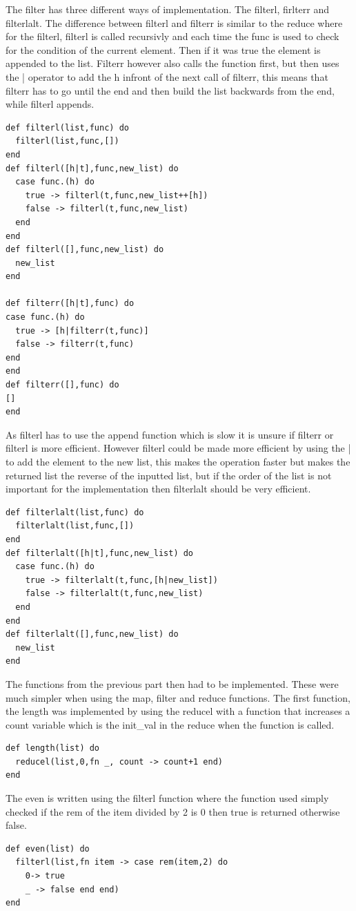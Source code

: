 \documentclass[a4paper,11pt]{article}
\begin{document}
The filter has three different ways of implementation. The filterl, firlterr and filterlalt. The difference between filterl and filterr is similar to the reduce where for the filterl, filterl is called recursivly and each time the func is used to check for the condition of the current element. Then if it was true the element is appended to the list. Filterr however also calls the function first, but then uses the | operator to add the h infront of the next call of filterr, this means that filterr has to go until the end and then build the list backwards from the end, while filterl appends. 

\begin{verbatim}
def filterl(list,func) do
  filterl(list,func,[])
end
def filterl([h|t],func,new_list) do
  case func.(h) do
    true -> filterl(t,func,new_list++[h])
    false -> filterl(t,func,new_list)
  end
end
def filterl([],func,new_list) do
  new_list
end

def filterr([h|t],func) do
case func.(h) do
  true -> [h|filterr(t,func)]
  false -> filterr(t,func)
end
end
def filterr([],func) do
[]
end
\end{verbatim}
As filterl has to use the append function which is slow it is unsure if filterr or filterl is more efficient. However filterl could be made more efficient by using the | to add the element to the new list, this makes the operation faster but makes the returned list the reverse of the inputted list, but if the order of the list is 
not important for the implementation then filterlalt should be very efficient. 
\begin{verbatim}
def filterlalt(list,func) do
  filterlalt(list,func,[])
end
def filterlalt([h|t],func,new_list) do
  case func.(h) do
    true -> filterlalt(t,func,[h|new_list])
    false -> filterlalt(t,func,new_list)
  end
end
def filterlalt([],func,new_list) do
  new_list
end
\end{verbatim}
The functions from the previous part then had to be implemented. 
These were much simpler when using the map, filter and reduce functions. 
The first function, the length was implemented by using the reducel with a function that 
increases a count variable which is the init\_val in the reduce when the function is called. 
\begin{verbatim}
def length(list) do
  reducel(list,0,fn _, count -> count+1 end)
end
\end{verbatim}
The even is written using the filterl function where the function used simply checked if the rem of the item divided by 2 is 0 then true is returned otherwise false. 
\begin{verbatim}
def even(list) do
  filterl(list,fn item -> case rem(item,2) do
    0-> true
    _ -> false end end)
end
\end{verbatim}
\end{document}
